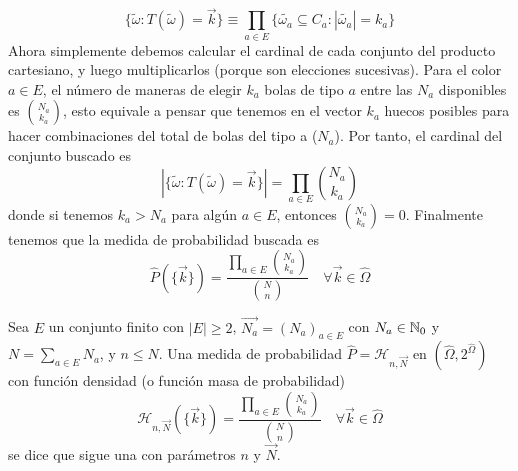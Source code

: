 \begin{equation*}
    \{\tilde{\omega} : T(\tilde{\omega})=\vec{k}\} \equiv \prod_{a\in E} \{\tilde{\omega_a} \subseteq C_a: |\tilde{\omega_a}| = k_a\}
\end{equation*}
Ahora simplemente debemos calcular el cardinal de cada conjunto del producto cartesiano, y luego multiplicarlos (porque son elecciones sucesivas). Para el color $a\in E$, el número de maneras de elegir $k_a$ bolas de tipo $a$ entre las $N_a$ disponibles es $\binom{N_a}{k_a}$, esto equivale a pensar que tenemos en el vector $k_a$ huecos posibles para hacer combinaciones del total de bolas del tipo a ($N_a$). Por tanto, el cardinal del conjunto buscado es
\begin{equation*}
    |\{\tilde{\omega} : T(\tilde{\omega})=\vec{k}\}| = \prod_{a\in E} \binom{N_a}{k_a}
\end{equation*}
donde si tenemos $k_a > N_a$ para algún $a\in E$, entonces $\binom{N_a}{k_a}=0$. Finalmente tenemos que la medida de probabilidad buscada es
\begin{equation*}
    \hat{P}(\{\vec{k}\}) = \dfrac{\prod\limits_{a\in E} \binom{N_a}{k_a}}{\binom{N}{n}} \quad \forall \vec{k} \in \hat{\Omega}
\end{equation*}

\begin{definicion}
    Sea $E$ un conjunto finito con $|E| \geq 2$, $\vec{N_a}=(N_a)_{a\in E}$ con $N_a \in \mathbb{N}_0$ y $N=\sum\limits_{a\in E} N_a$, y $n \leq N$. Una medida de probabilidad $\hat{P}=\mathcal{H}_{n,\vec{N}}$ en $(\hat{\Omega}, 2^{\hat{\Omega}})$ con función densidad (o función masa de probabilidad)
    \begin{equation*}
        \mathcal{H}_{n,\vec{N}}(\{\vec{k}\}) = \dfrac{\prod\limits_{a\in E} \binom{N_a}{k_a}}{\binom{N}{n}} \quad \forall \vec{k} \in \hat{\Omega}
    \end{equation*}
    se dice que sigue una  con parámetros $n$ y $\vec{N}$.
\end{definicion}

